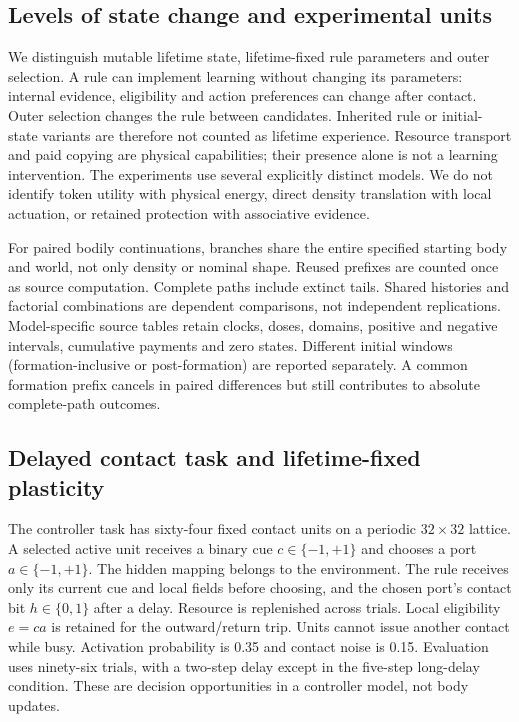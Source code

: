 \subsection*{Levels of state change and experimental units}
We distinguish mutable lifetime state, lifetime-fixed rule parameters and outer selection. A rule can implement learning without changing its parameters: internal evidence, eligibility and action preferences can change after contact. Outer selection changes the rule between candidates. Inherited rule or initial-state variants are therefore not counted as lifetime experience. Resource transport and paid copying are physical capabilities; their presence alone is not a learning intervention. The experiments use several explicitly distinct models. We do not identify token utility with physical energy, direct density translation with local actuation, or retained protection with associative evidence.

For paired bodily continuations, branches share the entire specified starting body and world, not only density or nominal shape. Reused prefixes are counted once as source computation. Complete paths include extinct tails. Shared histories and factorial combinations are dependent comparisons, not independent replications. Model-specific source tables retain clocks, doses, domains, positive and negative intervals, cumulative payments and zero states. Different initial windows (formation-inclusive or post-formation) are reported separately. A common formation prefix cancels in paired differences but still contributes to absolute complete-path outcomes.

\subsection*{Delayed contact task and lifetime-fixed plasticity}
The controller task has sixty-four fixed contact units on a periodic $32\times32$ lattice. A selected active unit receives a binary cue $c\in\{-1,+1\}$ and chooses a port $a\in\{-1,+1\}$. The hidden mapping belongs to the environment. The rule receives only its current cue and local fields before choosing, and the chosen port's contact bit $h\in\{0,1\}$ after a delay. Resource is replenished across trials. Local eligibility $e=ca$ is retained for the outward/return trip. Units cannot issue another contact while busy. Activation probability is 0.35 and contact noise is 0.15. Evaluation uses ninety-six trials, with a two-step delay except in the five-step long-delay condition. These are decision opportunities in a controller model, not body updates.

